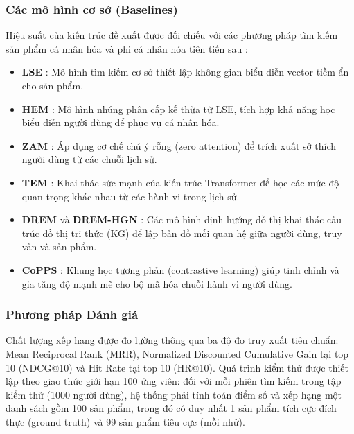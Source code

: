 \subsubsection*{Các mô hình cơ sở (Baselines)}
Hiệu suất của kiến trúc đề xuất được đối chiếu với các phương pháp tìm kiếm sản phẩm cá nhân hóa và phi cá nhân hóa tiên tiến sau
:
\begin{itemize}
    \item \textbf{LSE} \cite{24}: Mô hình tìm kiếm cơ sở thiết lập không gian biểu diễn vector tiềm ẩn cho sản phẩm.
    \item \textbf{HEM} \cite{25}: Mô hình nhúng phân cấp kế thừa từ LSE, tích hợp khả năng học biểu diễn người dùng để phục vụ cá nhân hóa.
    \item \textbf{ZAM} \cite{26}: Áp dụng cơ chế chú ý rỗng (zero attention) để trích xuất sở thích người dùng từ các chuỗi lịch sử.
    \item \textbf{TEM} \cite{27}: Khai thác sức mạnh của kiến trúc Transformer để học các mức độ quan trọng khác nhau từ các hành vi trong lịch sử.
    \item \textbf{DREM} \cite{28} và \textbf{DREM-HGN} \cite{29}: Các mô hình định hướng đồ thị khai thác cấu trúc đồ thị tri thức (KG) để lập bản đồ mối quan hệ giữa người dùng, truy vấn và sản phẩm.
    \item \textbf{CoPPS} \cite{23}: Khung học tương phản (contrastive learning) giúp tinh chỉnh và gia tăng độ mạnh mẽ cho bộ mã hóa chuỗi hành vi người dùng.
\end{itemize}

\subsubsection*{Phương pháp Đánh giá}
Chất lượng xếp hạng được đo lường thông qua ba độ đo truy xuất tiêu chuẩn: Mean Reciprocal Rank (MRR), Normalized Discounted Cumulative Gain tại top 10 (NDCG@10) \cite{23} và Hit Rate tại top 10 (HR@10). Quá trình kiểm thử được thiết lập theo giao thức giới hạn 100 ứng viên: đối với mỗi phiên tìm kiếm trong tập kiểm thử (1000 người dùng), hệ thống phải tính toán điểm số và xếp hạng một danh sách gồm 100 sản phẩm, trong đó có duy nhất 1 sản phẩm tích cực đích thực (ground truth) và 99 sản phẩm tiêu cực (mồi nhử).


